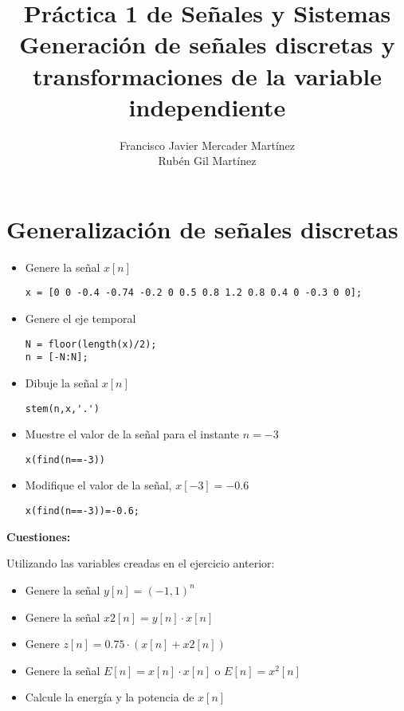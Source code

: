 \documentclass{article}
\title{Práctica 1 de Señales y Sistemas\\
Generación de señales discretas y transformaciones de 
la variable independiente}
\author{Francisco Javier Mercader Martínez\\ Rubén Gil Martínez}
\date{}
\begin{document}
\maketitle
\section{Generalización de señales discretas}
\begin{itemize}[label=$-$]
	\item Genere la señal $x[n]$
	
	\begin{lstlisting}
x = [0 0 -0.4 -0.74 -0.2 0 0.5 0.8 1.2 0.8 0.4 0 -0.3 0 0];
	\end{lstlisting}
	\item Genere el eje temporal
	
	\begin{lstlisting}
N = floor(length(x)/2);
n = [-N:N];
	\end{lstlisting}
	\item Dibuje la señal $x[n]$
	
	\begin{lstlisting}
stem(n,x,'.')
	\end{lstlisting}
	\item Muestre el valor de la señal para el instante $n=-3$
\begin{lstlisting}
x(find(n==-3))
\end{lstlisting}
	\item Modifique el valor de la señal, $x[-3]=-0.6$
\begin{lstlisting}
x(find(n==-3))=-0.6;
\end{lstlisting}
\end{itemize}
\textbf{Cuestiones:}

Utilizando las variables creadas en el ejercicio anterior:
\begin{itemize}[label=$-$]
	\item Genere la señal $y[n]=(-1,1)^n$
	

	\item Genere la señal $x2[n]=y[n]\cdot x[n]$
	\item Genere $z[n]=0.75\cdot(x[n]+x2[n])$
	\item Genere la señal $E[n]=x[n]\cdot x[n]$ o $E[n]=x^2[n]$
	\item Calcule la energía y la potencia de $x[n]$
\end{itemize}

\pagebreak
\end{document}
